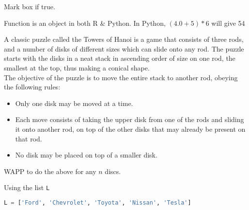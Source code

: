 \documentclass[12pt]{exam}
\begin{document}
\begin{questions}
\addpoints


\question[3] Mark box if true.
\addpoints
\begin{checkboxes}
\choice Function is an object in both R \& Python.
\choice In Python, $(4.0 + 5) * 6$ will give 54
\end{checkboxes}


\question[15]  A classic puzzle called the Towers of Hanoi is a game that consists
of three rods, and a number of disks of different sizes which can slide onto any rod.
The puzzle starts with the disks in a neat stack in ascending order of size on one rod, the smallest at the top, thus making a conical shape.\\
The objective of the puzzle is to move the entire stack to another rod,  obeying the
following rules: \\
\begin{itemize}
\item Only one disk may be moved at a time.
\item Each move consists of taking the upper disk from one of the rods and sliding it
onto another rod, on top of the other disks that may already be present on that
rod. 
\item No disk may be placed on top of a smaller disk.
\end{itemize}
WAPP to do the above for any $n$ discs.
\makeemptybox{2in}
\addpoints

\question[5] Using the list \texttt{L} \\

\begin{lstlisting}[language=Python]
L = ['Ford', 'Chevrolet', 'Toyota', 'Nissan', 'Tesla'] 
\end{lstlisting}
\noaddpoints %
\begin{parts}

\end{parts}
\end{questions}
\end{document}
